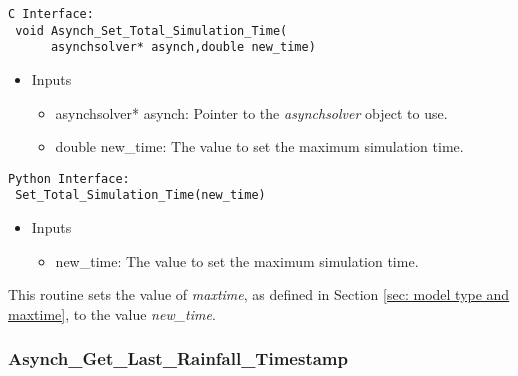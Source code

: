 \documentclass[12pt]{article}
\begin{document}
\begin{lstlisting}[style=CStyle]
 C Interface:
 void Asynch_Set_Total_Simulation_Time(
	  asynchsolver* asynch,double new_time)
\end{lstlisting}
\begin{itemize}
 \item Inputs
  \begin{itemize}
   \item asynchsolver* asynch: Pointer to the \emph{asynchsolver} object to use.
   \item double new\_time: The value to set the maximum simulation time.
  \end{itemize}
\end{itemize}
\begin{lstlisting}[style=PythonStyle]
 Python Interface:
 Set_Total_Simulation_Time(new_time)
\end{lstlisting}
\begin{itemize}
 \item Inputs
  \begin{itemize}
   \item new\_time: The value to set the maximum simulation time.
  \end{itemize}
\end{itemize}
This routine sets the value of \emph{maxtime}, as defined in Section \ref{sec: model type and maxtime}, to the value \emph{new\_time}.


\subsubsection{Asynch\_Get\_Last\_Rainfall\_Timestamp} \label{sec: asynch_get_last_rainfall_timestamp}
\end{document}
